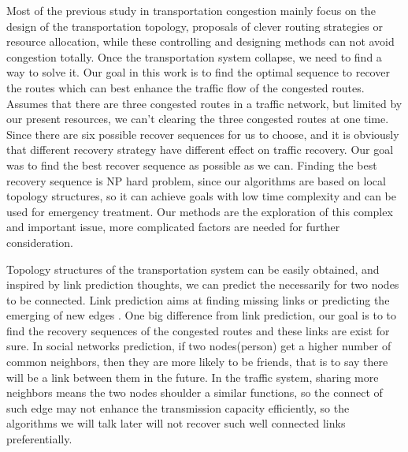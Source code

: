 \documentclass[onecolumn,preprintnumbers,amsmath,amssymb]{revtex4}
\begin{document}
Most of the previous study in transportation congestion mainly focus on the design of the transportation topology, proposals of clever routing strategies or resource allocation, while these controlling and designing methods can not avoid congestion totally. 
Once the transportation system collapse, we need to find a way to solve it. 
Our goal in this work is to find the optimal sequence to recover the routes which can best enhance the traffic flow of the congested routes. 
Assumes that there are three congested routes in a traffic network, but limited by our present resources, we can't clearing the three congested routes at one time. 
Since there are six possible recover sequences for us to choose, and it is obviously
that different recovery strategy have different effect on traffic recovery.
Our goal was to find the best recover sequence as possible as we can. 
Finding the best recovery sequence is NP hard problem, since our algorithms are based on local topology structures, so it can achieve goals with low time complexity and can be used for emergency treatment. 
Our methods are the exploration of this complex and important issue, more complicated factors are needed for further consideration. 

Topology structures of the transportation system can be easily obtained, and inspired by link prediction thoughts, we can predict the necessarily for two nodes to be connected. 
Link prediction aims at finding missing links or predicting the emerging of new edges \cite{}.
One big difference from link prediction, our goal is to to find the recovery sequences of the congested routes and these links are exist for sure.  
In social networks prediction, if two nodes(person) get a higher number of common neighbors, then they are more likely to be friends, that is to say there will be a link
between them in the future. 
In the traffic system, sharing more neighbors means the two nodes shoulder a similar functions, so the connect of such edge may not enhance the transmission capacity efficiently, so the algorithms we will talk later will not recover such well connected links preferentially.  
\end{document}
